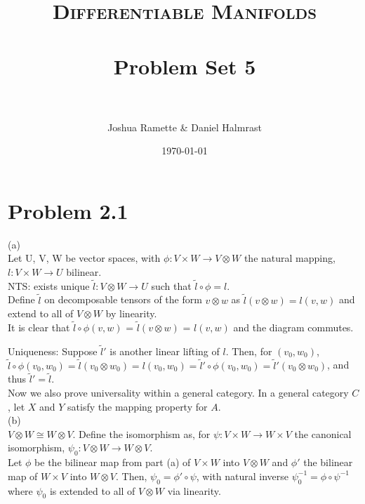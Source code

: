 \documentclass[paper=a4, fontsize=11pt]{scrartcl} %
\title{
\normalfont \normalsize 
\textsc{Differentiable Manifolds} \\ [25pt] %
\horrule{0.5pt} \\[0.4cm] %
\huge Problem Set 5 \\ %
\horrule{2pt} \\[0.5cm] %
}
\author{Joshua Ramette \& Daniel Halmrast} %
\date{\normalsize\today} %
\numberwithin{equation}{section} %
\numberwithin{figure}{section} %
\numberwithin{table}{section} %
\begin{document}
\maketitle %


\section*{Problem 2.1}
(a) \\
Let U, V, W be vector spaces, with $\phi: V \times W \to V \otimes W$ the natural mapping, $ l: V \times W \to U$ bilinear. \\

NTS: exists unique $\widetilde{l}: V \otimes W \to U$ such that $\widetilde{l} \circ \phi = l$.\\

Define $\widetilde{l}$ on decomposable tensors of the form $v \otimes w$ as $\widetilde{l}(v \otimes w) = l(v,w)$ and extend to all of $V \otimes W$ by linearity. \\

It is clear that $\widetilde{l} \circ \phi(v, w) $ = $\widetilde{l} (v \otimes w) $ = $l(v,w)$ and the diagram commutes.

Uniqueness: Suppose $\widetilde{l}'$ is another linear lifting of $l$. Then, for $(v_0, w_0)$, $\widetilde{l} \circ \phi(v_0, w_0) = \widetilde{l}(v_0 \otimes w_0) = l(v_0,w_0) = \widetilde{l}' \circ \phi(v_0,w_0) = \widetilde{l}'(v_0 \otimes w_0) $, and thus $\widetilde{l}' = \widetilde{l}$. \\

Now we also prove universality within a general category. In a general category $C$, let $X$ and $Y$ satisfy the mapping property for $A$. \\

(b) \\
$V \otimes W \cong W \otimes V$. Define the isomorphism as, for $\psi: V \times W \to W \times V$ the canonical isomorphism, $\psi_0: V \otimes W \to W \otimes V$. \\

Let $\phi$ be the bilinear map from part (a) of $V \times W$ into $V \otimes W$ and $\phi'$ the bilinear map of $W \times V$ into $W \otimes V$. Then, $ \psi_0 = \phi' \circ \psi$, with natural inverse $\psi_0 ^{-1} = \phi \circ \psi^{-1}$ where $\psi_0$ is extended to all of $V \otimes W$ via linearity. \\
\end{document}
